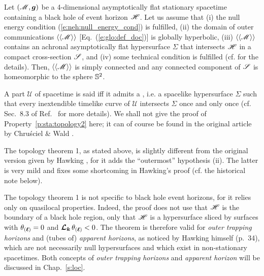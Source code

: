 \begin{prop}
\label{p:sta:topology2}
Let $(\mathscr{M}, \bm{g})$ be a 4-dimensional asymptotically flat stationary spacetime
containing a black hole of event horizon $\mathscr{H}$.
Let us assume that (i) the
null energy condition (\ref{e:neh:null_energy_cond}) is fulfilled,
(ii) the domain of outer communications $\langle\langle \mathscr{M}\rangle\rangle$
[Eq.~(\ref{e:glo:def_doc})]
is globally hyperbolic,
(iii) $\langle\langle \mathscr{M}\rangle\rangle$ contains an achronal asymptotically
flat hypersurface $\Sigma$ that intersects $\mathscr{H}$ in a compact cross-section $\mathscr{S}$,
and (iv) some technical condition is fulfilled (cf. \cite{ChrusW94b} for the details).
Then, $\langle\langle \mathscr{M}\rangle\rangle$ is simply connected and
any connected component of $\mathscr{S}$ is homeomorphic to the sphere $\mathbb{S}^2$.
\end{prop}
A part $\mathscr{U}$ of spacetime is said
\label{d:sta:glob_hyperbol}
iff it admits a \label{d:sta:Cauchy_surface}, i.e. a spacelike
hypersurface $\Sigma$ such that every inextendible timelike curve of $\mathscr{U}$
intersects $\Sigma$ once and only once (cf. Sec.~8.3 of Ref.~\cite{Wald84} for more
details). We shall not give the proof of Property~\ref{p:sta:topology2} here; it can of course
be found in the original article by Chru\'sciel \& Wald \cite{ChrusW94b}.

\begin{remark}
The topology theorem 1, as stated above, is slightly different from the original
version given by Hawking \cite{Hawki72,Hawki73,HawkiE73}, for it adds the ``outermost'' hypothesis (ii).
The latter is very mild and fixes some shortcoming in Hawking's proof
(cf. the historical note below).
\end{remark}

\begin{remark}
The topology theorem 1 is not specific to black hole event horizons, for
it relies only on quasilocal properties. Indeed, the proof does not use
that $\mathscr{H}$ is the boundary of a black hole region, only that $\mathscr{H}$ is a hypersurface
sliced by surfaces with $\theta_{(\bm{\ell})} = 0$ and $\bm{\mathcal{L}}_{\bm{k}}\, \theta_{(\bm{\ell})} < 0$.
The theorem is therefore valid for \emph{outer trapping horizons} \cite{Haywa94}
and (tubes of) \emph{apparent horizons}, as noticed by Hawking himself \cite{Hawki73} (p.~34),
which are not necessarily null hypersurfaces and which exist in non-stationary spacetimes.
Both concepts of \emph{outer trapping horizons} and \emph{apparent horizon}
will be discussed in Chap.~\ref{s:loc}.
\end{remark}

